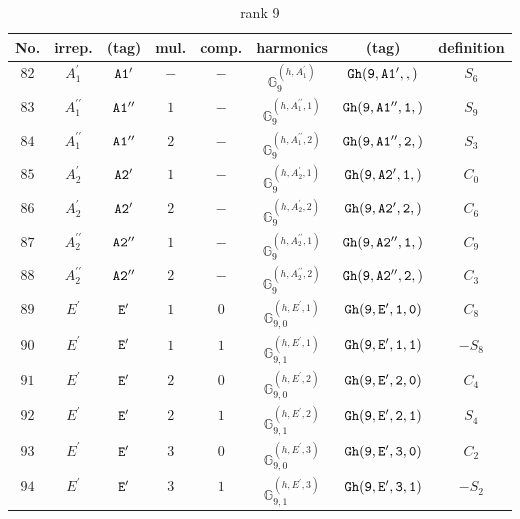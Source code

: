 \documentclass[fleqn,8pt]{jsarticle}
\begin{document}
\begin{table}[ht!]
\begin{center}
\caption{rank 9}
\renewcommand{\arraystretch}{1.3}
\begin{tabular}{cccccccc} \hline \hline
No. & irrep. & (tag) & mul. & comp. & harmonics & (tag) & definition \\ \hline
$ 82 $ & $ A_{1}^{\prime} $ & $ {\tt A1'} $ & $ - $ & $ - $ & $ \mathbb{G}_{9}^{(h,A_{1}^{\prime})} $ & $ {\tt Gh(9,A1',,)} $ & $ S_{6} $ \\
$ 83 $ & $ A_{1}^{\prime\prime} $ & $ {\tt A1''} $ & $ 1 $ & $ - $ & $ \mathbb{G}_{9}^{(h,A_{1}^{\prime\prime},1)} $ & $ {\tt Gh(9,A1'',1,)} $ & $ S_{9} $ \\
$ 84 $ & $ A_{1}^{\prime\prime} $ & $ {\tt A1''} $ & $ 2 $ & $ - $ & $ \mathbb{G}_{9}^{(h,A_{1}^{\prime\prime},2)} $ & $ {\tt Gh(9,A1'',2,)} $ & $ S_{3} $ \\
$ 85 $ & $ A_{2}^{\prime} $ & $ {\tt A2'} $ & $ 1 $ & $ - $ & $ \mathbb{G}_{9}^{(h,A_{2}^{\prime},1)} $ & $ {\tt Gh(9,A2',1,)} $ & $ C_{0} $ \\
$ 86 $ & $ A_{2}^{\prime} $ & $ {\tt A2'} $ & $ 2 $ & $ - $ & $ \mathbb{G}_{9}^{(h,A_{2}^{\prime},2)} $ & $ {\tt Gh(9,A2',2,)} $ & $ C_{6} $ \\
$ 87 $ & $ A_{2}^{\prime\prime} $ & $ {\tt A2''} $ & $ 1 $ & $ - $ & $ \mathbb{G}_{9}^{(h,A_{2}^{\prime\prime},1)} $ & $ {\tt Gh(9,A2'',1,)} $ & $ C_{9} $ \\
$ 88 $ & $ A_{2}^{\prime\prime} $ & $ {\tt A2''} $ & $ 2 $ & $ - $ & $ \mathbb{G}_{9}^{(h,A_{2}^{\prime\prime},2)} $ & $ {\tt Gh(9,A2'',2,)} $ & $ C_{3} $ \\
$ 89 $ & $ E^{\prime} $ & $ {\tt E'} $ & $ 1 $ & $ 0 $ & $ \mathbb{G}_{9,0}^{(h,E^{\prime},1)} $ & $ {\tt Gh(9,E',1,0)} $ & $ C_{8} $ \\
$ 90 $ & $ E^{\prime} $ & $ {\tt E'} $ & $ 1 $ & $ 1 $ & $ \mathbb{G}_{9,1}^{(h,E^{\prime},1)} $ & $ {\tt Gh(9,E',1,1)} $ & $ - S_{8} $ \\
$ 91 $ & $ E^{\prime} $ & $ {\tt E'} $ & $ 2 $ & $ 0 $ & $ \mathbb{G}_{9,0}^{(h,E^{\prime},2)} $ & $ {\tt Gh(9,E',2,0)} $ & $ C_{4} $ \\
$ 92 $ & $ E^{\prime} $ & $ {\tt E'} $ & $ 2 $ & $ 1 $ & $ \mathbb{G}_{9,1}^{(h,E^{\prime},2)} $ & $ {\tt Gh(9,E',2,1)} $ & $ S_{4} $ \\
$ 93 $ & $ E^{\prime} $ & $ {\tt E'} $ & $ 3 $ & $ 0 $ & $ \mathbb{G}_{9,0}^{(h,E^{\prime},3)} $ & $ {\tt Gh(9,E',3,0)} $ & $ C_{2} $ \\
$ 94 $ & $ E^{\prime} $ & $ {\tt E'} $ & $ 3 $ & $ 1 $ & $ \mathbb{G}_{9,1}^{(h,E^{\prime},3)} $ & $ {\tt Gh(9,E',3,1)} $ & $ - S_{2} $ \\

\end{tabular}
\end{center}
\end{table}
\end{document}
